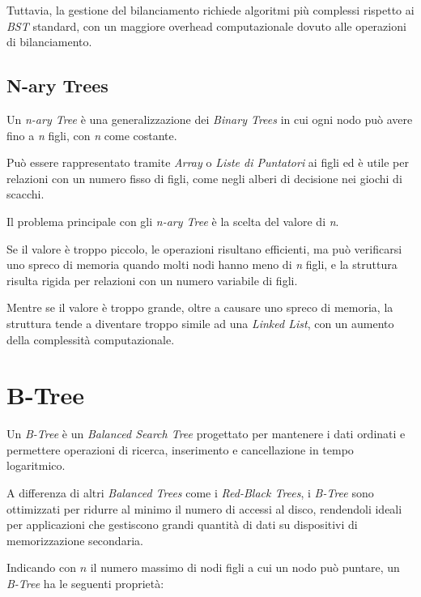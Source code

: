 \documentclass[12pt,a4paper,openright,twoside]{book}
\begin{document}
            Tuttavia, la gestione del bilanciamento richiede algoritmi più complessi rispetto ai \textit{BST} standard, con un maggiore overhead computazionale dovuto alle operazioni di bilanciamento.

        \subsection{N-ary Trees}

            Un \textit{n-ary Tree} è una generalizzazione dei \textit{Binary Trees} in cui ogni nodo può avere fino a \textit{n} figli, con \textit{n} come costante.

            Può essere rappresentato tramite \textit{Array} o \textit{Liste di Puntatori} ai figli ed è utile per relazioni con un numero fisso di figli, come negli alberi di decisione nei giochi di scacchi.

            Il problema principale con gli \textit{n-ary Tree} è la scelta del valore di \textit{n}.

            Se il valore è troppo piccolo, le operazioni risultano efficienti, ma può verificarsi uno spreco di memoria quando molti nodi hanno meno di \textit{n} figli, e la struttura risulta rigida per relazioni con un numero variabile di figli.

            Mentre se il valore è troppo grande, oltre a causare uno spreco di memoria, la struttura tende a diventare troppo simile ad una \textit{Linked List}, con un aumento della complessità computazionale.

        \cite{cormen2022introduction}

    \section{B-Tree}

        Un \textit{B-Tree} è un \textit{Balanced Search Tree} progettato per mantenere i dati ordinati e permettere operazioni di ricerca, inserimento e cancellazione in tempo logaritmico.

        A differenza di altri \textit{Balanced Trees} come i \textit{Red-Black Trees}, i \textit{B-Tree} sono ottimizzati per ridurre al minimo il numero di accessi al disco, rendendoli ideali per applicazioni che gestiscono grandi quantità di dati su dispositivi di memorizzazione secondaria.

        Indicando con \( n \) il numero massimo di nodi figli a cui un nodo può puntare, un \textit{B-Tree} ha le seguenti proprietà:
\end{document}
